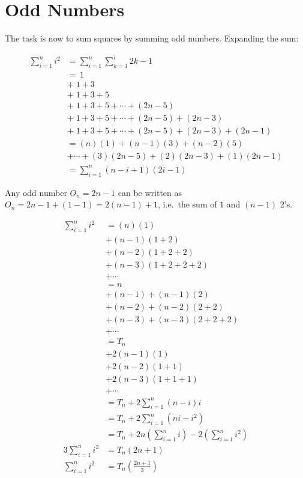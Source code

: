 \documentclass[final,letterpaper]{article}
\begin{document}
\section{Odd Numbers}

The task is now to sum squares by summing odd numbers. Expanding the sum:

\begin{align*}
	\sum_{i=1}^{n}{i^2}
	&= \sum_{i=1}^{n}{\sum_{k=1}^{i}{2k - 1}} \\
	&=\,1 \\
	&+\;1 + 3 \\
	&+\;1 + 3 + 5 \\
	&+\;1 + 3 + 5 + \cdots + (2n - 5) \\
	&+\;1 + 3 + 5 + \cdots + (2n - 5) + (2n - 3) \\
	&+\;1 + 3 + 5 + \cdots + (2n - 5) + (2n - 3) + (2n - 1) \\
	&= (n)(1) + (n - 1)(3) + (n - 2)(5) \\
	&+ \cdots + (3)(2n - 5) + (2)(2n - 3) + (1)(2n - 1) \\
	&= \sum_{i=1}^{n}{(n - i + 1)(2i - 1)}
\end{align*}

Any odd number $O_n = 2n - 1$ can be written as $O_n = 2n - 1 + (1 - 1)
= 2(n - 1) + 1$, i.e.\ the sum of $1$ and $(n - 1)$ $2$'s.

\begin{align*}
	\sum_{i=1}^{n}{i^2}
	&= (n)(1) \\
	&+ (n - 1)(1 + 2) \\
	&+ (n - 2)(1 + 2 + 2) \\
	&+ (n - 3)(1 + 2 + 2 + 2) \\
	&+ \cdots \\
	&= n \\
	&+ (n - 1) + (n - 1)(2) \\
	&+ (n - 2) + (n - 2)(2 + 2) \\
	&+ (n - 3) + (n - 3)(2 + 2 + 2) \\
	&+ \cdots \\
	&= T_n \\
	&+ 2(n - 1)(1) \\
	&+ 2(n - 2)(1 + 1) \\
	&+ 2(n - 3)(1 + 1 + 1) \\
	&+ \cdots \\
	&= T_n + 2\sum_{i=1}^{n}{(n-i)i} \\
	&= T_n + 2\sum_{i=1}^{n}{(ni - i^2)} \\
	&= T_n + 2n\left(\sum_{i=1}^{n}{i}\right) -
	2\left(\sum_{i=1}^{n}{i^2}\right) \\
	3\sum_{i=1}^{n}{i^2} &= T_n(2n + 1)\\
	\sum_{i=1}^{n}{i^2} &= T_n\left(\frac{2n + 1}{3}\right)
\end{align*}
\end{document}
